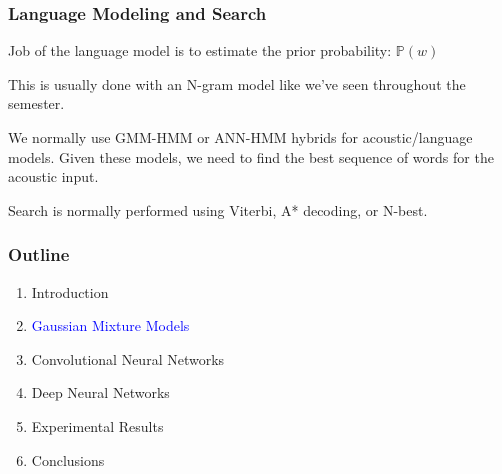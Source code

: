 \documentclass[notes]{beamer}
\newcommand{\prob}[1]{\mathbb{P}\left( #1 \right)}
\begin{document}
\begin{frame}
	\frametitle{Language Modeling and Search}
	\begin{center}
		Job of the language model is to estimate the prior probability:
		$\prob{w}$
	\end{center}
	\begin{center}
		This is usually done with an N-gram model like we've seen throughout the semester.
	\end{center}
	\vfill
	\begin{center}
		We normally use GMM-HMM or ANN-HMM hybrids for acoustic/language models. Given these models, we need to find the best sequence of words for the acoustic input.
	\end{center}
	\begin{center}
		Search is normally performed using Viterbi, A* decoding, or N-best.
	\end{center}
	
\end{frame}

\begin{frame}
	\frametitle{Outline}
	
	\begin{enumerate}
		\item Introduction
		\item \textcolor{blue}{Gaussian Mixture Models}
		\item Convolutional Neural Networks
		\item Deep Neural Networks
		\item Experimental Results
		\item Conclusions
	\end{enumerate}
\end{frame}
\end{document}
